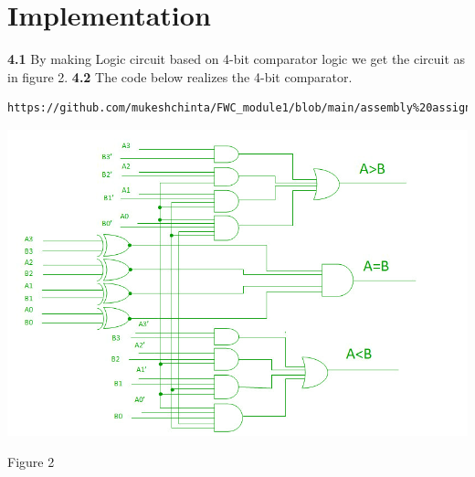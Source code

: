 \documentclass[10pt, a4paper]{article}
\begin{document}
\section{Implementation}
\textbf{4.1}
By making Logic circuit based on 4-bit comparator logic we get the circuit as in figure 2.
\textbf{4.2}
The code below realizes the 4-bit comparator.
\begin{lstlisting}
https://github.com/mukeshchinta/FWC_module1/blob/main/assembly%20assignment/assemble/codes/4bit%20assembly.txt
\end{lstlisting}
 \begin{center}
\includegraphics[scale=.40]{4bit.jpg}
\end{center}
\begin{center}
    Figure 2
\end{center}
\end{document}
